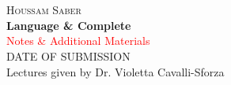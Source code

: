 \documentclass[12pt]{report}
\numberwithin{equation}{section}
\begin{document}

    \begin{titlepage}                                                   %
        
    \centering

    \begin{flushleft}
        \\
        \\
    \end{flushleft}

    \raggedleft
    \vspace*{\baselineskip}
    {\Large \textsc{Houssam Saber}} \\[0.167\textheight]                            %
    {\Huge \textbf{Language \& Complete}} \\[\baselineskip]                         %
    {\textcolor{red}{\LARGE Notes \& Additional Materials}} \\ \vspace{4cm}
    \Large{DATE OF SUBMISSION} \vfill
    \\ \vfill
    Lectures given by Dr. Violetta Cavalli-Sforza

    \end{titlepage}


    \tableofcontents                                 %
    \listoffigures                                   %
    \newpage 



\end{document}
